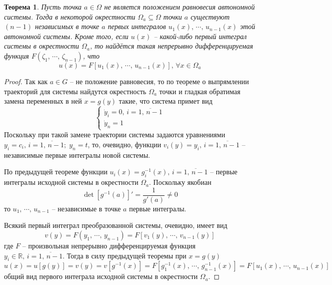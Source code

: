 \documentclass[a4paper,12pt]{article}
\theoremstyle{plain}
\newtheorem{theorem}{Теорема}[section]
\theoremstyle{definition}
\theoremstyle{remark}
\begin{document}
\begin{theorem}
	Пусть точка $a \in \Omega$ не является положением равновесия автономной системы. Тогда в некоторой окрестности $\Omega_a \subseteq \Omega$ точки $a$ существуют $(n - 1)$ независимых в точке $a$ первых интегралов $u_1(x),\,\cdots,\,u_{n - 1}(x)$ этой автономной системы. Кроме того, если $u(x)$ -- какой-либо первый интеграл системы в окрестности $\Omega_a$, то найдётся такая непрерывно дифференцируемая функция $F(\zeta_1,\,\cdots,\,\zeta_{n-1})$, что
	\[u(x) = F[u_1(x),\,\cdots,\,u_{n-1}(x)],\, \forall x \in \Omega_a\]
\end{theorem}

\begin{proof}
	Так как $a \in G$ -- не положение равновесия, то по теореме о выпрямлении траекторий для системы найдутся окрестность $\Omega_a$ точки и гладкая обратимая замена переменных в ней $x = g(y)$ такие, что система примет вид
	\[\begin{cases}
			\dot{y}_i = 0,\, i = \overline{1,\,n-1} \\
			\dot{y}_n = 1
		\end{cases}\]
	Поскольку при такой замене траектории системы задаются уравнениями $y_i = c_i,\, i = \overline{1,\,n-1};\; y_n = t$, то, очевидно, функции $v_i(y) = y_i,\, i = \overline{1,\,n-1}$ -- независимые первые интегралы новой системы.

	По предыдущей теореме функции $u_i(x) = g^{-1}_i(x),\, i = \overline{1,\,n-1}$ -- первые интегралы исходной системы в окрестности $\Omega_a$. Поскольку якобиан
	\[\det[g^{-1}(a)]' = \frac{1}{g'(a)} \neq 0\]
	то $u_1,\,\cdots,\,u_{n-1}$ -- независимые в точке $a$ первые интегралы.

	Всякий первый интеграл преобразованной системы, очевидно, имеет вид
	\[v(y) = F(y_1,\,\cdots,\,y_{n-1}) = F[v_1(y),\,\cdots,\,v_{n-1}(y)]\]
	где $F$ -- произвольная непрерывно дифференцируемая функция $y_i \in \mathbb{R},\, i = \overline{1,\,n-1}$. Тогда в силу предыдущей теоремы при $x = g(y)$
	\[u(x) = u[g(y)] = v(y) = v[g^{-1}(x)] = F[g_1^{-1}(x),\,\cdots,\,g_{n-1}^{-1}(x)] = F[u_1(x),\,\cdots,\,u_{n-1}(x)]\]
	общий вид первого интеграла исходной системы в окрестности $\Omega_a$.
\end{proof}
\end{document}
